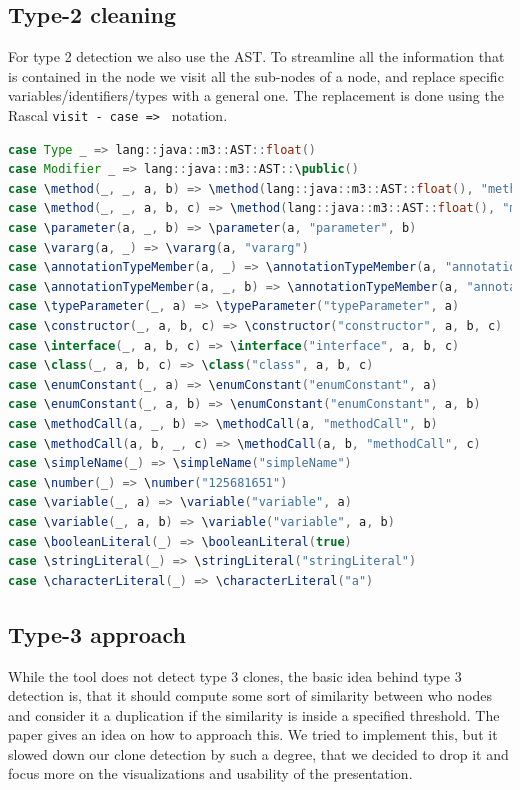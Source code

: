\documentclass{uva-inf-article}
\begin{document}
\subsection{Type-2 cleaning}\label{type2alg}

For type 2 detection we also use the AST. To streamline all the information that is contained in the node we visit all the sub-nodes of a node,  and replace specific variables/identifiers/types with a general one. The replacement is done using the Rascal \texttt{visit - case => } notation.

\begin{lstlisting}[language=Java, style=mystyle,caption={Node elements stripping method for type-2 clone detection.},captionpos=b]
case Type _ => lang::java::m3::AST::float()
case Modifier _ => lang::java::m3::AST::\public()
case \method(_, _, a, b) => \method(lang::java::m3::AST::float(), "method", a, b)
case \method(_, _, a, b, c) => \method(lang::java::m3::AST::float(), "method", a, b, c)
case \parameter(a, _, b) => \parameter(a, "parameter", b)
case \vararg(a, _) => \vararg(a, "vararg") 
case \annotationTypeMember(a, _) => \annotationTypeMember(a, "annotationTypeMember")
case \annotationTypeMember(a, _, b) => \annotationTypeMember(a, "annotationTypeMember", b)
case \typeParameter(_, a) => \typeParameter("typeParameter", a)
case \constructor(_, a, b, c) => \constructor("constructor", a, b, c)
case \interface(_, a, b, c) => \interface("interface", a, b, c)
case \class(_, a, b, c) => \class("class", a, b, c)
case \enumConstant(_, a) => \enumConstant("enumConstant", a) 
case \enumConstant(_, a, b) => \enumConstant("enumConstant", a, b)
case \methodCall(a, _, b) => \methodCall(a, "methodCall", b)
case \methodCall(a, b, _, c) => \methodCall(a, b, "methodCall", c)
case \simpleName(_) => \simpleName("simpleName")
case \number(_) => \number("125681651")
case \variable(_, a) => \variable("variable", a) 
case \variable(_, a, b) => \variable("variable", a, b) 
case \booleanLiteral(_) => \booleanLiteral(true)
case \stringLiteral(_) => \stringLiteral("stringLiteral")
case \characterLiteral(_) => \characterLiteral("a")
\end{lstlisting}

\subsection{Type-3 approach}
While the tool does not detect type 3 clones, the basic idea behind type 3 detection is, that it should compute some sort of similarity between who nodes and consider it a duplication if the similarity is inside a specified threshold. The paper \cite{baxter1998clone} gives an idea on how to approach this. We tried to implement this, but it slowed down our clone detection by such a degree, that we decided to drop it and focus more on the visualizations and usability of the presentation. 
\end{document}
